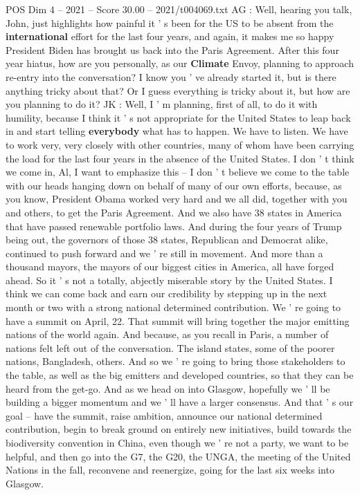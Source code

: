 \begin{textsample}{POS Dim 4 – 2021 – Score 30.00 – 2021/t004069.txt}
AG : Well, hearing you talk, John, just highlights how painful it ' s been for the US to be absent from the \textbf{international} effort for the last four years, and again, it makes me so happy President Biden has brought us back into the Paris Agreement.
After this four year hiatus, how are you personally, as our \textbf{Climate} Envoy, planning to approach re-entry into the conversation?
I know you ' ve already started it, but is there anything tricky about that?
Or I guess everything is tricky about it, but how are you planning to do it?
JK : Well, I ' m planning, first of all, to do it with humility, because I think it ' s not appropriate for the United States to leap back in and start telling \textbf{everybody} what has to happen.
We have to listen.
We have to work very, very closely with other countries, many of whom have been carrying the load for the last four years in the absence of the United States.
I don ' t think we come in, Al, I want to emphasize this -- I don ' t believe we come to the table with our heads hanging down on behalf of many of our own efforts, because, as you know, President Obama worked very hard and we all did, together with you and others, to get the Paris Agreement.
And we also have 38 states in America that have passed renewable portfolio laws.
And during the four years of Trump being out, the governors of those 38 states, Republican and Democrat alike, continued to push forward and we ' re still in movement.
And more than a thousand mayors, the mayors of our biggest cities in America, all have forged ahead.
So it ' s not a totally, abjectly miserable story by the United States.
I think we can come back and earn our credibility by stepping up in the next month or two with a strong national determined contribution.
We ' re going to have a summit on April, 22.
That summit will bring together the major emitting nations of the world again.
And because, as you recall in Paris, a number of nations felt left out of the conversation.
The island states, some of the poorer nations, Bangladesh, others.
And so we ' re going to bring those stakeholders to the table, as well as the big emitters and developed countries, so that they can be heard from the get-go.
And as we head on into Glasgow, hopefully we ' ll be building a bigger momentum and we ' ll have a larger consensus.
And that ' s our goal -- have the summit, raise ambition, announce our national determined contribution, begin to break ground on entirely new initiatives, build towards the biodiversity convention in China, even though we ' re not a party, we want to be helpful, and then go into the G7, the G20, the UNGA, the meeting of the United Nations in the fall, reconvene and reenergize, going for the last six weeks into Glasgow.

\end{textsample}
